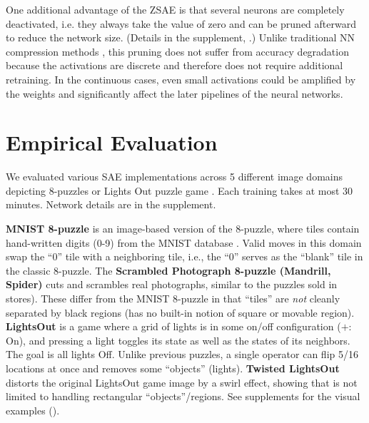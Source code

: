 
One additional advantage of the ZSAE is that
several neurons are completely deactivated, i.e. they always take the value of zero
and can be pruned afterward to reduce the network size.
(Details in the supplement, .)
Unlike traditional NN compression methods \cite{cheng2017survey}, this pruning does not suffer from
accuracy degradation because the activations are discrete and therefore does not require additional retraining.
In the continuous cases, even small activations could be amplified by the weights and significantly affect the
later pipelines of the neural networks.

\section{Empirical Evaluation}
\label{evaluation}

We evaluated various SAE implementations across 5 different
image domains depicting 8-puzzles or Lights Out puzzle game \cite{lightsout}.
Each training takes at most 30 minutes.
Network details are in the supplement.

\textbf{MNIST 8-puzzle}
is an image-based version of the 8-puzzle, where tiles contain hand-written digits (0-9) from the  MNIST database \cite{lecun1998gradient}.
Valid moves in this domain swap the ``0'' tile  with a neighboring tile, i.e., the ``0'' serves as the ``blank'' tile in the classic 8-puzzle. 
The \textbf{Scrambled Photograph 8-puzzle (Mandrill, Spider)} cuts and scrambles real photographs, similar to the puzzles sold in stores).
These differ from the MNIST 8-puzzle in that ``tiles'' are \textit{not} cleanly separated by black regions
(\latentplanner has no built-in notion of square or movable region).
\textbf{LightsOut} is
a game where a grid of lights is in some on/off configuration ($+$: On),
and pressing a light toggles its state as well as the states of its neighbors.
The goal is all lights Off.
Unlike previous puzzles, a single operator can flip 5/16 locations at once and
removes some ``objects'' (lights).
\textbf{Twisted LightsOut} distorts the original LightsOut game image by a swirl effect,
showing that \latentplanner is not limited to handling rectangular ``objects''/regions.
See supplements for the visual examples ().

